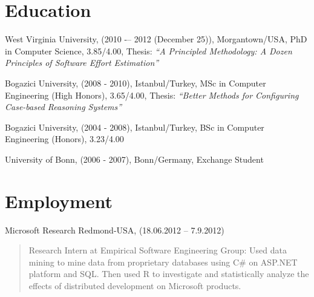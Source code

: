 \documentclass[margin]{res}
\begin{document}
 


\address{{ 1325 Stewartstown Road, Apt. G6, Morgantown, WV 26505 $\bullet$ (304)-685-9487 $\bullet$ ekrem@kocaguneli.com $\bullet$ www.kocaguneli.com }\\[12pt]} %
 
 
\begin{resume} 

\section{Education}
\begin{list}{}{\leftmargin=0.5em}
\item West Virginia University, (2010 -– 2012 (December 25)), Morgantown/USA, PhD in Computer Science, 3.85/4.00, Thesis: \textit{``A Principled Methodology: A Dozen Principles of Software Effort Estimation''}
\item Bogazici University, (2008 - 2010), Istanbul/Turkey, MSc in Computer Engineering (High Honors), 3.65/4.00,
Thesis: \textit{``Better Methods for Configuring Case-based Reasoning Systems''}
\item Bogazici University, (2004 - 2008), Istanbul/Turkey, BSc in Computer Engineering (Honors), 3.23/4.00
\item University of Bonn, (2006 - 2007), Bonn/Germany, Exchange Student
\end{list}

\section{Employment} 

\begin{list}{}{\leftmargin=0.5em}

\item Microsoft Research Redmond-USA, (18.06.2012 – 7.9.2012) 
\begin{quote}
Research Intern at Empirical Software Engineering Group: Used data mining to mine data from proprietary databases using C\# on ASP.NET platform and SQL. Then used R to investigate and statistically analyze the effects of distributed development on Microsoft products. 
\end{quote}


\end{list}
\end{resume}
\end{document}
